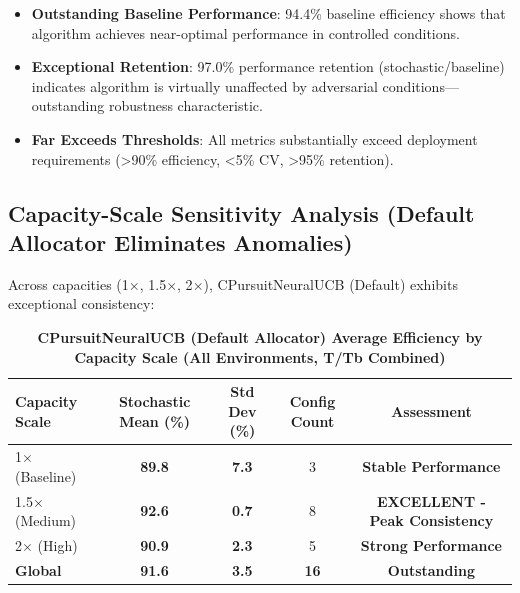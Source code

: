 \documentclass[12pt,a4paper]{article}
\newcommand{\success}[1]{\textcolor{successcolor}{\textbf{#1}}}
\begin{document}
\begin{tcolorbox}[colback=stochasticcolor!10,colframe=stochasticcolor,title=\textbf{Stochastic Environment Analysis (CPursuitNeuralUCB Default Allocator, 1$\times$–2$\times$ Capacities, T/Tb Combined)}]
\begin{itemize}
\item \success{Outstanding Baseline Performance}: 94.4\% baseline efficiency shows that algorithm achieves near-optimal performance in controlled conditions.

\item \success{Exceptional Retention}: 97.0\% performance retention (stochastic/baseline) indicates algorithm is virtually unaffected by adversarial conditions—outstanding robustness characteristic.

\item \success{Far Exceeds Thresholds}: All metrics substantially exceed deployment requirements (>90\% efficiency, <5\% CV, >95\% retention).
\end{itemize}

\end{tcolorbox}

\subsection{Capacity-Scale Sensitivity Analysis (Default Allocator Eliminates Anomalies)}

Across capacities (1$\times$, 1.5$\times$, 2$\times$), CPursuitNeuralUCB (Default) exhibits exceptional consistency:

\begin{table}[H]
\small
\centering
\caption{\success{CPursuitNeuralUCB (Default Allocator) Average Efficiency by Capacity Scale (All Environments, T/Tb Combined)}}
\begin{tabular}{|l|c|c|c|c|}
\hline
\textbf{Capacity Scale} & \textbf{Stochastic Mean (\%)} & \textbf{Std Dev (\%)} & \textbf{Config Count} & \textbf{Assessment} \\
\hline
1$\times$ (Baseline) & \success{89.8} & \success{7.3} & 3 & \success{Stable Performance} \\
1.5$\times$ (Medium) & \success{92.6} & \success{0.7} & 8 & \success{EXCELLENT - Peak Consistency} \\
2$\times$ (High) & \success{90.9} & \success{2.3} & 5 & \success{Strong Performance} \\
\hline
\textbf{Global} & \textbf{\success{91.6}} & \textbf{\success{3.5}} & \textbf{16} & \textbf{\success{Outstanding}} \\
\hline
\end{tabular}
\end{table}
\end{document}

